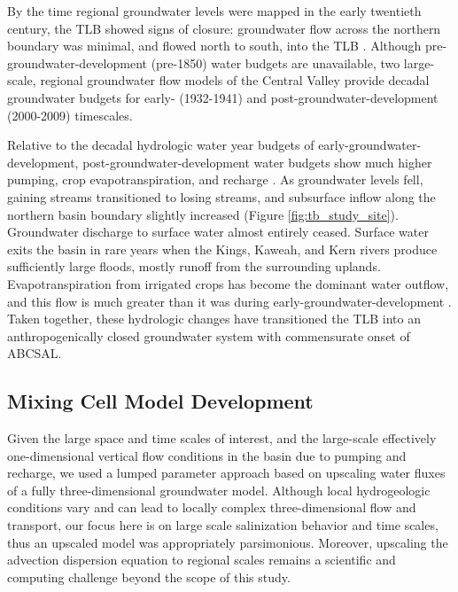 By the time regional groundwater levels were mapped in the early twentieth century, the TLB showed signs of closure: groundwater flow across the northern boundary was minimal, and flowed north to south, into the TLB \citep{mendenhall1916ground, ingerson1941hydrology}. Although pre-groundwater-development (pre-1850) water budgets are unavailable, two large-scale, regional groundwater flow models of the Central Valley \citep{Brush2013, Faunted.2009} provide decadal groundwater budgets for early- (1932-1941) and post-groundwater-development (2000-2009) timescales.

Relative to the decadal hydrologic water year budgets of early-groundwater-development, post-groundwater-development water budgets show much higher pumping, crop evapotranspiration, and recharge \citep{Brush2013}. As groundwater levels fell, gaining streams transitioned to losing streams, and subsurface inflow along the northern basin boundary slightly increased (Figure \ref{fig:tb_study_site}). Groundwater discharge to surface water almost entirely ceased. Surface water exits the basin in rare years when the Kings, Kaweah, and Kern rivers produce sufficiently large floods, mostly runoff from the surrounding uplands. Evapotranspiration from irrigated crops has become the dominant water outflow, and this flow is much greater than it was during early-groundwater-development \citep{Brush2013}. Taken together, these hydrologic changes have transitioned the TLB into an anthropogenically closed groundwater system with commensurate onset of ABCSAL.  




%
%
\subsection{Mixing Cell Model Development}
\label{ss_2_3}

Given the large space and time scales of interest, and the large-scale effectively one-dimensional vertical flow conditions in the basin due to pumping and recharge, we used a lumped parameter approach based on upscaling water fluxes of a fully three-dimensional groundwater model. %
Although local hydrogeologic conditions vary and can lead to locally complex three-dimensional flow and transport, our focus here is on large scale salinization behavior and time scales, thus an upscaled model was appropriately parsimonious. %
Moreover, upscaling the advection dispersion equation to regional scales remains a scientific and computing challenge \citep{guo2019adaptive, guo2019upscaling} beyond the scope of this study.

